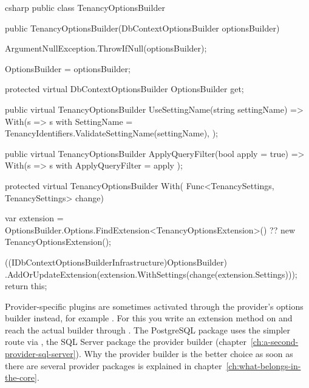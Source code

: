 \begin{sourcecode}{csharp}
public class TenancyOptionsBuilder
{
    public TenancyOptionsBuilder(DbContextOptionsBuilder optionsBuilder)
    {
        ArgumentNullException.ThrowIfNull(optionsBuilder);

        OptionsBuilder = optionsBuilder;
    }

    protected virtual DbContextOptionsBuilder OptionsBuilder { get; }

    public virtual TenancyOptionsBuilder UseSettingName(string settingName)
        => With(s => s with
        {
            SettingName = TenancyIdentifiers.ValidateSettingName(settingName),
        });

    public virtual TenancyOptionsBuilder ApplyQueryFilter(bool apply = true)
        => With(s => s with { ApplyQueryFilter = apply });

    protected virtual TenancyOptionsBuilder With(
        Func<TenancySettings, TenancySettings> change)
    {
        var extension = OptionsBuilder.Options.FindExtension<TenancyOptionsExtension>()
                        ?? new TenancyOptionsExtension();

        ((IDbContextOptionsBuilderInfrastructure)OptionsBuilder)
            .AddOrUpdateExtension(extension.WithSettings(change(extension.Settings)));
        return this;
    }
}
\end{sourcecode}

\begin{note}
  Provider-specific plugins are sometimes activated through the provider's options builder
  instead, for example . For this you write
  an extension method on
  and reach the actual builder through
  .
  The PostgreSQL package uses the simpler route via
  , the SQL Server
  package the provider builder (chapter~\ref{ch:a-second-provider-sql-server}). Why the
  provider builder is the better choice as soon as there are several provider packages is
  explained in chapter~\ref{ch:what-belongs-in-the-core}.
\end{note}

